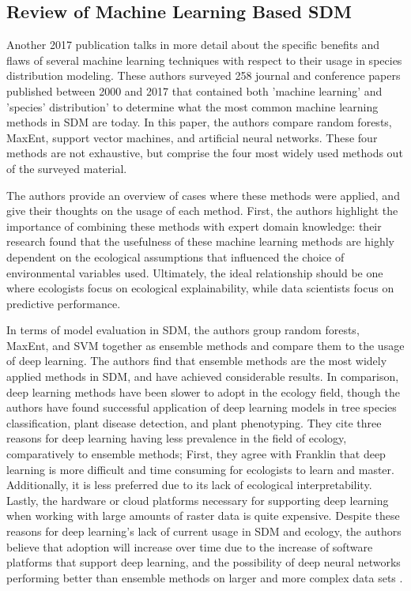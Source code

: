 \documentclass[12pt, oneside]{article}
\begin{document}
\begin{normalsize}
\subsection{Review of Machine Learning Based SDM}

Another 2017 publication talks in more detail about the specific benefits and flaws of several machine learning techniques with respect to their usage in species distribution modeling.  These authors surveyed 258 journal and conference papers published between 2000 and 2017 that contained both 'machine learning' and 'species' distribution' to determine what the most common machine learning methods in SDM are today. In this paper, the authors compare random forests, MaxEnt, support vector machines, and artificial neural networks. These four methods are not exhaustive, but comprise the four most widely used methods out of the surveyed material. 

The authors provide an overview of cases where these methods were applied, and give their thoughts on the usage of each method. First, the authors highlight the importance of combining these methods with expert domain knowledge: their research found that the usefulness of these machine learning methods are highly dependent on the ecological assumptions that influenced the choice of environmental variables used. Ultimately, the ideal relationship should be one where ecologists focus on ecological explainability, while data scientists focus on predictive performance.

In terms of model evaluation in SDM, the authors group random forests, MaxEnt, and SVM together as ensemble methods and compare them to the usage of deep learning. The authors find that ensemble methods are the most widely applied methods in SDM, and have achieved considerable results. In comparison, deep learning methods have been slower to adopt in the ecology field, though the authors have found successful application of deep learning models in tree species classification, plant disease detection, and plant phenotyping. They cite three reasons for deep learning having less prevalence in the field of ecology, comparatively to ensemble methods; First, they agree with Franklin that deep learning is more difficult and time consuming for ecologists to learn and master. Additionally, it is less preferred due to its lack of ecological interpretability. Lastly, the hardware or cloud platforms necessary for supporting deep learning when working with large amounts of raster data is quite expensive. Despite these reasons for deep learning's lack of current usage in SDM and ecology, the authors believe that adoption will increase over time due to the increase of software platforms that support deep learning, and the possibility of deep neural networks performing better than ensemble methods on larger and more complex data sets \cite{8328619}.



\end{normalsize}
\end{document}
